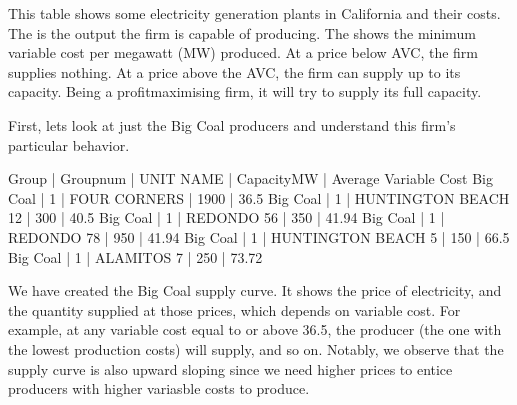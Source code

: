 \documentclass[letterpaper,10pt,english]{jupyterBook}
\begin{document}
\sphinxAtStartPar
This table shows some electricity generation plants in California and their costs. The  is the output the firm is capable of producing. The  shows the minimum variable cost per megawatt (MW) produced. At a price below AVC, the firm supplies nothing. At a price above the AVC, the firm can supply up to its capacity. Being a profit\sphinxhyphen{}maximising firm, it will try to supply its full capacity.

\sphinxAtStartPar
First, lets look at just the Big Coal producers and understand this firm’s particular behavior.

\begin{sphinxVerbatim}[commandchars=\\\{\}]
  
   
\end{sphinxVerbatim}

\begin{sphinxVerbatim}[commandchars=\\\{\}]
Group    | Group\PYGZus{}num | UNIT NAME            | Capacity\PYGZus{}MW | Average Variable Cost
Big Coal | 1         | FOUR CORNERS         | 1900        | 36.5
Big Coal | 1         | HUNTINGTON BEACH 1\PYGZam{}2 | 300         | 40.5
Big Coal | 1         | REDONDO 5\PYGZam{}6          | 350         | 41.94
Big Coal | 1         | REDONDO 7\PYGZam{}8          | 950         | 41.94
Big Coal | 1         | HUNTINGTON BEACH 5   | 150         | 66.5
Big Coal | 1         | ALAMITOS 7           | 250         | 73.72
\end{sphinxVerbatim}

\noindent{}

\sphinxAtStartPar
We have created the Big Coal supply curve. It shows the price of electricity, and the quantity supplied at those prices, which depends on variable cost. For example, at any variable cost equal to or above 36.5, the producer  (the one with the lowest production costs) will supply, and so on. Notably, we observe that the supply curve is also upward sloping since we need higher prices to entice producers with higher variasble costs to produce.
\end{document}
